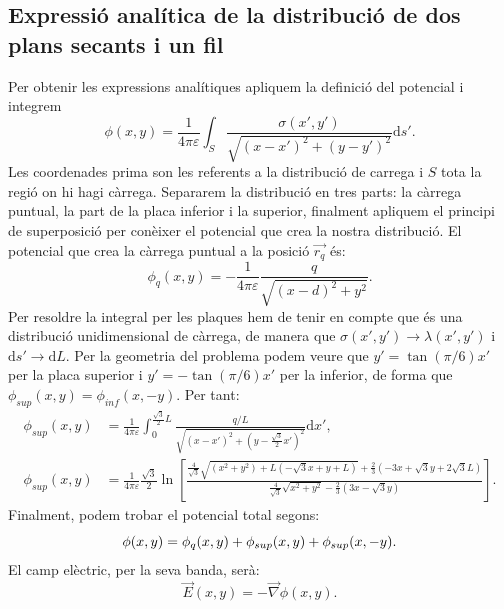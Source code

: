 \documentclass[a4paper,10.5pt]{report}
\begin{document}
\begin{appendices}
\newpage
\subsection{Expressió analítica de la distribució de dos plans secants i un fil}
\label{an:a6}
Per obtenir les expressions analítiques apliquem la definició del potencial i integrem
\begin{equation}
	\phi (x,y) = \frac{1}{4\pi\varepsilon}\int_S\frac{\sigma(x',y')}{\sqrt{(x-x')^2+(y-y')^2}}\mathrm{d}s'.
\end{equation}
Les coordenades prima son les referents a la distribució de carrega i $S$ tota la regió on hi hagi càrrega. Separarem la distribució en tres parts: la càrrega puntual, la part de la placa inferior i la superior, finalment apliquem el principi de superposició per conèixer el potencial que crea la nostra distribució. El potencial que crea la càrrega puntual a la posició $\vec{r_q}$ és:
\begin{equation}
	\phi_q (x,y) = -\frac{1}{4\pi\varepsilon}\frac{q}{\sqrt{(x-d)^2+y^2}}.
\end{equation}
Per resoldre la integral per les plaques hem de tenir en compte que és una distribució unidimensional de càrrega, de manera que $\sigma(x',y') \rightarrow \lambda(x',y')$ i $\mathrm{d}s' \rightarrow \mathrm{d}L$. Per la geometria del problema podem veure que $y' = \tan(\pi/6)x'$ per la placa superior i $y' = -\tan(\pi/6)x'$ per la inferior, de forma que $\phi_{sup}(x,y) = \phi_{inf}(x,-y)$. Per tant:
\begin{align}
	\phi_{sup}(x,y)&=\frac{1}{4\pi\varepsilon}\int_{0}^{\frac{\sqrt{3}}{2}L} \frac{q/L}{\sqrt{(x-x')^2+(y-\frac{\sqrt{3}}{2}x')^2}}\mathrm{d}x', \\
	\phi_{sup}(x,y)&=\frac{1}{4\pi\varepsilon}\frac{\sqrt{3}}{2}\ln \left[\frac{\frac{4}{\sqrt{3}}\sqrt{(x^2+y^2)+L(-\sqrt{3}x+y+L)}+\frac{2}{3}(-3x+\sqrt{3}y+2\sqrt{3}L)}{\frac{4}{\sqrt{3}}\sqrt{x^2+y^2}-\frac{2}{3}(3x-\sqrt{3}y)}\right].
\end{align}
Finalment, podem trobar el potencial total segons:
\begin{equation}
	\phi(x,y) = \phi_q(x,y) + \phi_{sup}(x,y) + \phi_{sup}(x,-y). \\
\end{equation}
El camp elèctric, per la seva banda, serà:
\begin{equation}
	\vec{E}(x,y) = -\vec{\nabla}\phi(x,y).
\end{equation}
\newpage

\end{appendices}
\end{document}
